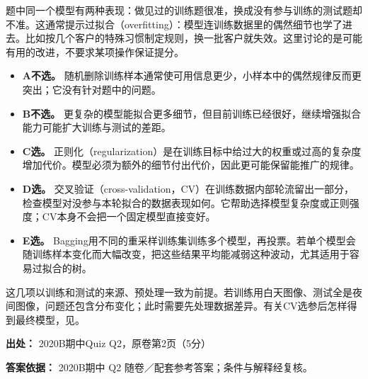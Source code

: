 题中同一个模型有两种表现：做见过的训练题很准，换成没有参与训练的测试题却不准。这通常提示过拟合（overfitting）：模型连训练数据里的偶然细节也学了进去。比如按几个客户的特殊习惯制定规则，换一批客户就失效。这里讨论的是可能有用的改进，不要求某项操作保证提分。



\begin{itemize}

\item \textbf{A不选。} 随机删除训练样本通常使可用信息更少，小样本中的偶然规律反而更突出；它没有针对题中的问题。

\item \textbf{B不选。} 更复杂的模型能拟合更多细节，但目前训练已经很好，继续增强拟合能力可能扩大训练与测试的差距。

\item \textbf{C选。} 正则化（regularization）是在训练目标中给过大的权重或过高的复杂度增加代价。模型必须为额外的细节付出代价，因此更可能保留能推广的规律。

\item \textbf{D选。} 交叉验证（cross-validation，CV）在训练数据内部轮流留出一部分，检查模型对没参与本轮拟合的数据表现如何。它帮助选择模型复杂度或正则强度；CV本身不会把一个固定模型直接变好。

\item \textbf{E选。} Bagging用不同的重采样训练集训练多个模型，再投票。若单个模型会随训练样本变化而大幅改变，把这些结果平均能减弱这种波动，尤其适用于容易过拟合的树。

\end{itemize}


这几项以训练和测试的来源、预处理一致为前提。若训练用白天图像、测试全是夜间图像，问题还包含分布变化；此时需要先处理数据差异。有关CV选参后怎样得到最终模型，见。


\textbf{出处：} 2020B期中Quiz Q2，原卷第2页（5分）


\textbf{答案依据：} 2020B期中 Q2 随卷／配套参考答案；条件与解释经复核。
